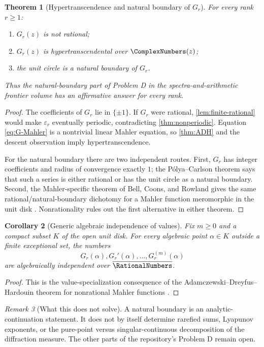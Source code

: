 \documentclass[11pt,oneside]{article}
\newtheorem{theorem}{Theorem}[section]
\newtheorem{corollary}[theorem]{Corollary}
\theoremstyle{definition}
\theoremstyle{remark}
\newtheorem{remark}[theorem]{Remark}
\begin{document}
\begin{theorem}[Hypertranscendence and natural boundary of $G_r$]\label{thm:G-main}
For every rank $r\geq1$:
\begin{enumerate}[label=(\roman*)]
\item $G_r(z)$ is not rational;
\item $G_r(z)$ is hypertranscendental over $\ComplexNumbers(z)$;
\item the unit circle is a natural boundary of $G_r$.
\end{enumerate}
Thus the natural-boundary part of Problem D in the spectra-and-arithmetic
frontier volume has an affirmative answer for every rank.
\end{theorem}

\begin{proof}
The coefficients of $G_r$ lie in $\{\pm1\}$.  If $G_r$ were rational,
\cref{lem:finite-rational} would make $\varepsilon_r$ eventually periodic,
contradicting \cref{thm:nonperiodic}.  Equation \eqref{eq:G-Mahler} is a
nontrivial linear Mahler equation, so \cref{thm:ADH} and the descent observation
imply hypertranscendence.

For the natural boundary there are two independent routes.  First,
$G_r$ has integer coefficients and radius of convergence exactly $1$; the
P\'olya--Carlson theorem says that such a series is either rational or has the
unit circle as a natural boundary.  Second, the Mahler-specific theorem of
Bell, Coons, and Rowland gives the same rational/natural-boundary dichotomy
for a Mahler function meromorphic in the unit disk \cite{bcr}.  Nonrationality
rules out the first alternative in either theorem.
\end{proof}

\begin{corollary}[Generic algebraic independence of values]\label{cor:G-values}
Fix $m\geq0$ and a compact subset $K$ of the open unit disk.  For every
algebraic point $\alpha\in K$ outside a finite exceptional set, the numbers
\[
 G_r(\alpha),G_r'(\alpha),\ldots,G_r^{(m)}(\alpha)
\]
are algebraically independent over $\overline\RationalNumbers$.
\end{corollary}

\begin{proof}
This is the value-specialization consequence of the
Adamczewski--Dreyfus--Hardouin theorem for nonrational Mahler functions
\cite{adh}.
\end{proof}

\begin{remark}[What this does not solve]
A natural boundary is an analytic-continuation statement.  It does not by
itself determine rarefied sums, Lyapunov exponents, or the pure-point versus
singular-continuous decomposition of the diffraction measure.  The other
parts of the repository's Problem D remain open.
\end{remark}
\end{document}
